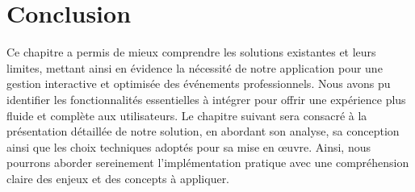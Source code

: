 \section*{Conclusion}

Ce chapitre a permis de mieux comprendre les solutions existantes et leurs limites, mettant ainsi en évidence la nécessité de notre application pour une gestion interactive et optimisée des événements professionnels. Nous avons pu identifier les fonctionnalités essentielles à intégrer pour offrir une expérience plus fluide et complète aux utilisateurs.  
Le chapitre suivant sera consacré à la présentation détaillée de notre solution, en abordant son analyse, sa conception ainsi que les choix techniques adoptés pour sa mise en œuvre.  
Ainsi, nous pourrons aborder sereinement l'implémentation pratique 
avec une compréhension claire des enjeux et des concepts à appliquer.

